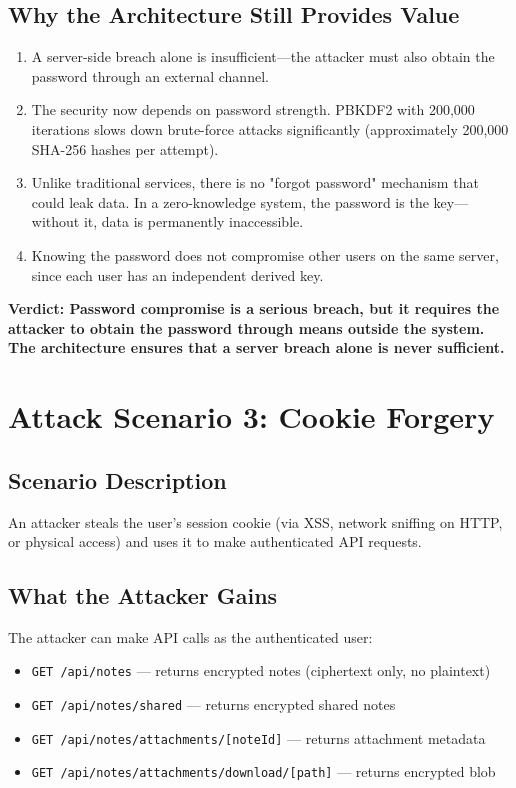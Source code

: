 \subsection{Why the Architecture Still Provides Value}

\begin{enumerate}
    \item A server-side breach alone is insufficient---the attacker must also obtain the password through an external channel.
    \item The security now depends on password strength. PBKDF2 with 200,000 iterations slows down brute-force attacks significantly (approximately 200,000 SHA-256 hashes per attempt).
    \item Unlike traditional services, there is no "forgot password" mechanism that could leak data. In a zero-knowledge system, the password is the key---without it, data is permanently inaccessible.
    \item Knowing the password does not compromise other users on the same server, since each user has an independent derived key.
\end{enumerate}

\textbf{Verdict: Password compromise is a serious breach, but it requires the attacker to obtain the password through means outside the system. The architecture ensures that a server breach alone is never sufficient.}

\section{Attack Scenario 3: Cookie Forgery}

\subsection{Scenario Description}

An attacker steals the user's session cookie (via XSS, network sniffing on HTTP, or physical access) and uses it to make authenticated API requests.

\subsection{What the Attacker Gains}

The attacker can make API calls as the authenticated user:
\begin{itemize}
    \item \texttt{GET /api/notes} --- returns encrypted notes (ciphertext only, no plaintext)
    \item \texttt{GET /api/notes/shared} --- returns encrypted shared notes
    \item \texttt{GET /api/notes/attachments/[noteId]} --- returns attachment metadata
    \item \texttt{GET /api/notes/attachments/download/[path]} --- returns encrypted blob
\end{itemize}


